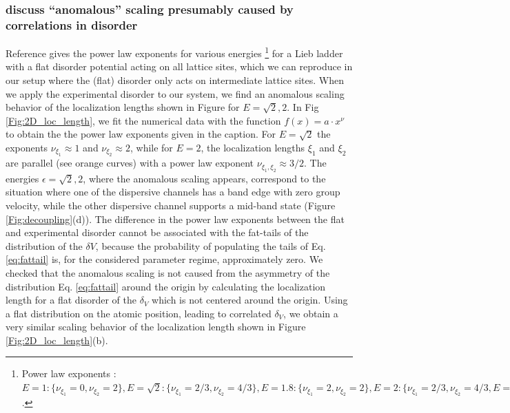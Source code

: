 \documentclass[prl,aps,twocolumn,showpacs,superscriptaddress,longbibliography]{revtex4-1}
\begin{document}
\subsubsection{discuss ``anomalous'' scaling presumably caused by correlations in disorder}
Reference \cite{Leykam2017} gives the power law exponents for various energies
%
\footnote{Power law exponents \cite{Leykam2017}:
$
E = 1:\{\nu_{\xi_1} = 0,\nu_{\xi_2} = 2\}, E = \sqrt 2:\{\nu_{\xi_1} = 2/3,\nu_{\xi_2} = 4/3\},E = 1.8:\{\nu_{\xi_1} = 2,\nu_{\xi_2} = 2\},
E = 2:\{\nu_{\xi_1} = 2/3,\nu_{\xi_2} = 4/3,E = \sqrt 6:\{\nu_{\xi_1} = 0,\nu_{\xi_2} = 2/3\}\}
$.}
for a Lieb ladder with a flat disorder 
potential acting on all lattice sites, which we can reproduce in our setup where the (flat) disorder only acts on intermediate lattice sites.
%
When we apply the experimental disorder to our system, we find an anomalous scaling behavior of the localization lengths
shown in Figure for $E = \sqrt{2}, 2$. In Fig \ref{Fig:2D_loc_length}, we fit the numerical data with the function $f(x) = a \cdot x^\nu$ to obtain the
the power law exponents given in the caption.
For $E = \sqrt 2$ the exponents $\nu_{\xi_1}\approx 1$ and  $\nu_{\xi_2}\approx 2$, while for $E = 2$, the localization lengths $\xi_1$ and $\xi_2$ are parallel (see orange curves) with a
power law exponent $\nu_{\xi_1,\xi_2} \approx 3/2$.
The energies $\epsilon = \sqrt 2, 2$, where the anomalous scaling appears, correspond to the situation where one of the dispersive channels has a band edge with zero group velocity,
while the other dispersive channel 
supports a mid-band state (Figure \ref{Fig:decoupling}(d)).
The difference in the power law exponents between the flat and experimental disorder cannot be 
associated with the fat-tails of the distribution of the $\delta V$, because 
the probability of populating the tails of Eq. \eqref{eq:fattail} is, for the considered parameter regime, approximately zero.
We checked that the anomalous scaling is not caused from the asymmetry of the distribution Eq. \eqref{eq:fattail} around the origin by calculating
the localization length for a flat disorder of the $\delta_V$ which is not centered around the origin.
Using a flat distribution on the atomic position, leading to correlated $\delta_V$, we obtain a very similar scaling behavior of the localization
length shown in Figure \ref{Fig:2D_loc_length}(b).




%
\end{document}
